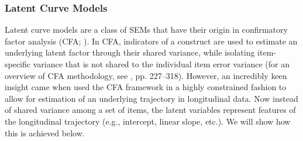 \documentclass[11pt]{article}
\begin{document}
\subsubsection{Latent Curve Models} \label{lcms}
Latent curve models are a class of SEMs that have their origin in confirmatory factor analysis (CFA; \cite{meredith_latent_1990}). In CFA, indicators of a construct are used to estimate an underlying latent factor through their shared variance, while isolating item-specific variance that is not shared to the individual item error variance (for an overview of CFA methodology, see \cite{bollen_structural_1989}, pp. 227–318). However, an incredibly keen insight came when \textcite{meredith_latent_1990} used the CFA framework in a highly constrained fashion to allow for estimation of an underlying trajectory in longitudinal data. Now instead of shared variance among a set of items, the latent variables represent features of the longitudinal trajectory (e.g., intercept, linear slope, etc.). We will show how this is achieved below.
\end{document}

